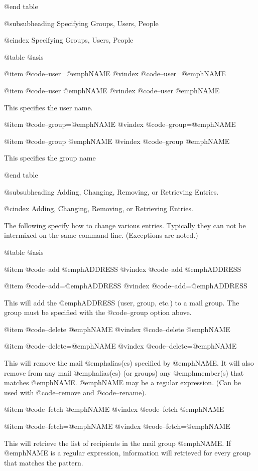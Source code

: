 @end table

@subsubheading Specifying Groups, Users, People

@cindex Specifying Groups, Users, People

@table @asis

@item @code{--user=}@emph{NAME}
@vindex @code{--user=}@emph{NAME}

@item @code{--user }@emph{NAME}
@vindex @code{--user }@emph{NAME}

This specifies the user name.

@item @code{--group=}@emph{NAME}
@vindex @code{--group=}@emph{NAME}

@item @code{--group }@emph{NAME}
@vindex @code{--group }@emph{NAME}

This specifies the group name

@end table

@subsubheading Adding, Changing, Removing, or Retrieving Entries.

@cindex Adding, Changing, Removing, or Retrieving Entries.

The following specify how to change various entries.  Typically they can not be
intermixed on the same command line.  (Exceptions are noted.)

@table @asis

@item @code{--add }@emph{ADDRESS}
@vindex @code{--add }@emph{ADDRESS}

@item @code{--add=}@emph{ADDRESS}
@vindex @code{--add=}@emph{ADDRESS}

This will add the @emph{ADDRESS} (user, group, etc.) to a mail group.  The group
must be specified with the @code{--group} option above.

@item @code{--delete }@emph{NAME}
@vindex @code{--delete }@emph{NAME}

@item @code{--delete=}@emph{NAME}
@vindex @code{--delete=}@emph{NAME}

This will remove the mail @emph{alias}(es) specified by @emph{NAME}.  It will also remove
from any mail @emph{alias}(es) (or groups) any @emph{member}(s) that matches @emph{NAME}.  @emph{NAME}
may be a regular expression.  (Can be used with @code{--remove} and @code{--rename}).

@item @code{--fetch }@emph{NAME}
@vindex @code{--fetch }@emph{NAME}

@item @code{--fetch=}@emph{NAME}
@vindex @code{--fetch=}@emph{NAME}

This will retrieve the list of recipients in the mail group @emph{NAME}.  If @emph{NAME}
is a regular expression, information will retrieved for every group that matches
the pattern.

